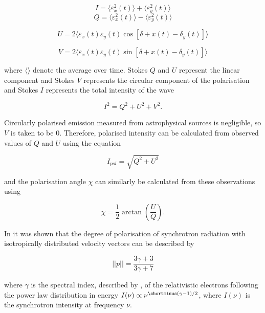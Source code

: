 \begin{equation}
    I = \langle \varepsilon_x^2(t)\rangle + \langle\varepsilon_y^2(t)\rangle 
\end{equation}
\begin{equation}
     Q = \langle \varepsilon_x^2(t)\rangle - \langle\varepsilon_y^2(t)\rangle 
\end{equation}
   
\begin{equation}
    U = 2\langle \varepsilon_x(t)\varepsilon_y(t)\cos [\delta+x(t) - \delta_y(t)]\rangle
\end{equation}
    
\begin{equation}    
    V = 2\langle \varepsilon_x(t)\varepsilon_y(t)\sin [\delta+x(t) - \delta_y(t)]\rangle
\end{equation}

where $\langle\rangle$ denote the average over time. Stokes $Q$ and $U$ represent the linear component and Stokes $V$ represents the circular component of the polarisation and Stokes $I$ represents the total intensity of the wave

\begin{equation}
    I^2 = Q^2+U^2+V^2.
\end{equation}

Circularly polarised emission measured from astrophysical sources is negligible, so $V$ is taken to be 0. Therefore, polarised intensity can be calculated from observed values of $Q$ and $U$ using the equation

\begin{equation}
    I_{pol} = \sqrt{Q^2+U^2}
\end{equation}

and the polarisation angle $\chi$ can similarly be calculated from these observations using 

\begin{equation}
    \chi = \frac{1}{2}\arctan \left(\frac{U}{Q}\right).
\end{equation}

In \cite{Roux} it was shown that the degree of polarisation of synchrotron radiation with isotropically distributed velocity vectors can be described by

\begin{equation}
    ||p|| = \frac{3\gamma +3}{3\gamma +7}
\end{equation}

where $\gamma$ is the spectral index, described by \cite{Ginzburg}, of the relativistic electrons following the power law distribution in energy $I(\nu) \propto \nu^{\shortminus(\gamma-1)/2}$, where $I(\nu)$ is the synchrotron intensity at frequency $\nu$.


